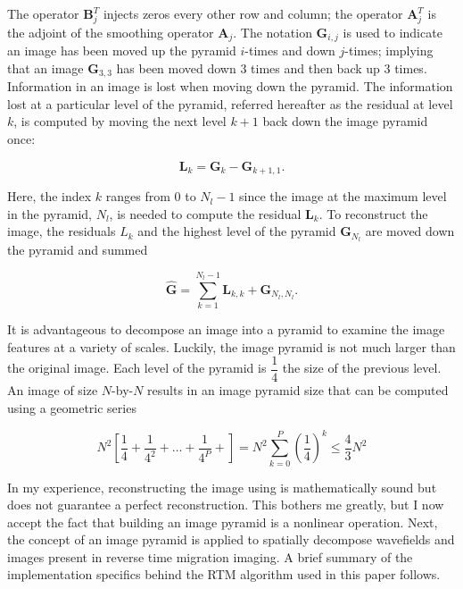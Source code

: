 The operator $\mathbf{B}^T_{j}$ injects zeros every other row and column; the operator $\mathbf{A}^T_{j}$ is the adjoint of the smoothing operator $\mathbf{A}_{j}$.  The notation $\mathbf{G}_{i,j}$ is used to indicate an image has been moved up the pyramid $i$-times and down $j$-times; implying that an image $\mathbf{G}_{3,3}$ has been moved down 3 times and then back up 3 times.  Information in an image is lost when moving down the pyramid.  The information lost at a particular level of the pyramid, referred hereafter as the residual at level $k$, is computed by moving the next level $k+1$ back down the image pyramid once:

\begin{equation} \label{eqn:residual}
\mathbf{L}_k = \mathbf{G}_k-\mathbf{G}_{k+1,1}.
\end{equation}

Here, the index $k$ ranges from 0 to $N_l-1$ since the image at the maximum level in the pyramid, $N_l$, is needed to compute the residual $\mathbf{L}_k$.  To reconstruct the image, the residuals $L_k$ and the highest level of the pyramid $\mathbf{G}_{N_l}$ are moved down the pyramid and summed

\begin{equation} \label{eqn:reconstruct}
\hat{\mathbf{G}}=\sum_{k=1}^{N_l-1}{\mathbf{L}_{k,k}} + \mathbf{G}_{N_l,N_l}.
\end{equation} 

It is advantageous to decompose an image into a pyramid to examine the image features at a variety of scales.  Luckily, the image pyramid is not much larger than the original image.  Each level of the pyramid is $\dfrac{1}{4}$ the size of the previous level.  An image of size $N$-by-$N$ results in an image pyramid size that can be computed using a geometric series 

\begin{equation}
N^2\left[\dfrac{1}{4}+\dfrac{1}{4^2}+\hdots+\dfrac{1}{4^P}+\right] = N^2\sum_{k=0}^{P} \left(\dfrac{1}{4}\right)^k \leq \dfrac{4}{3}N^2
\end{equation}

In my experience, reconstructing the image using  is mathematically sound but does not guarantee a perfect reconstruction.  This bothers me greatly, but I now accept the fact that building an image pyramid is a nonlinear operation.  Next, the concept of an image pyramid is applied to spatially decompose wavefields and images present in reverse time migration imaging.  A brief summary of the implementation specifics behind the RTM algorithm used in this paper follows.


